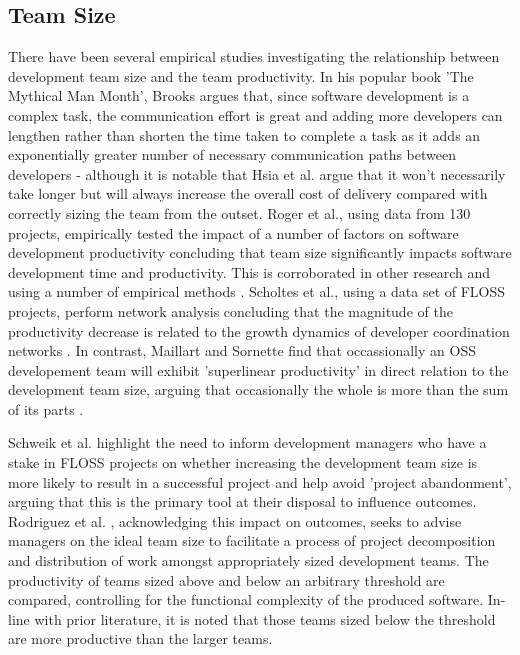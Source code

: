 \subsection{Team Size}
There have been several empirical studies investigating the relationship between development team size and the team productivity. In his popular book 'The Mythical Man Month', Brooks argues that, since software development is a complex task, the communication effort is great and adding more developers can lengthen rather than shorten the time taken to complete a task as it adds an exponentially greater number of necessary communication paths between developers \citep{brooks1986mythical} - although it is notable that Hsia et al. \citep{hsia1999brooks} argue that it won't necessarily take longer but will always increase the overall cost of delivery compared with correctly sizing the team from the outset. Roger et al., \citep{rodger2011knowledge} using data from 130 projects, empirically tested the impact of a number of factors on software development productivity concluding that team size significantly impacts software development time and productivity. This is corroborated in other research and using a number of empirical methods \citep{mcleod2011factors, lalsing2012people}. Scholtes et al., using a data set of FLOSS projects, perform network analysis concluding that the magnitude of the productivity decrease is related to the growth dynamics of developer coordination networks \citep{scholtes2016aristotle}. In contrast, Maillart and Sornette find that occassionally an OSS developement team will exhibit 'superlinear productivity' in direct relation to the development team size, arguing that occasionally the whole is more than the sum of its parts \citep{maillart2016aristotle}.

Schweik et al. \citep{schweik2008brooks} highlight the need to inform development managers who have a stake in FLOSS projects on whether increasing the development team size is more likely to result in a successful project and help avoid 'project abandonment', arguing that this is the primary tool at their disposal to influence outcomes. Rodriguez et al. \citep{rodriguez2012empirical}, acknowledging this impact on outcomes, seeks to advise managers on the ideal team size to facilitate a process of project decomposition and distribution of work amongst appropriately sized development teams. The productivity of teams sized above and below an arbitrary threshold are compared, controlling for the functional complexity of the produced software. In-line with prior literature, it is noted that those teams sized below the threshold are more productive than the larger teams. 

